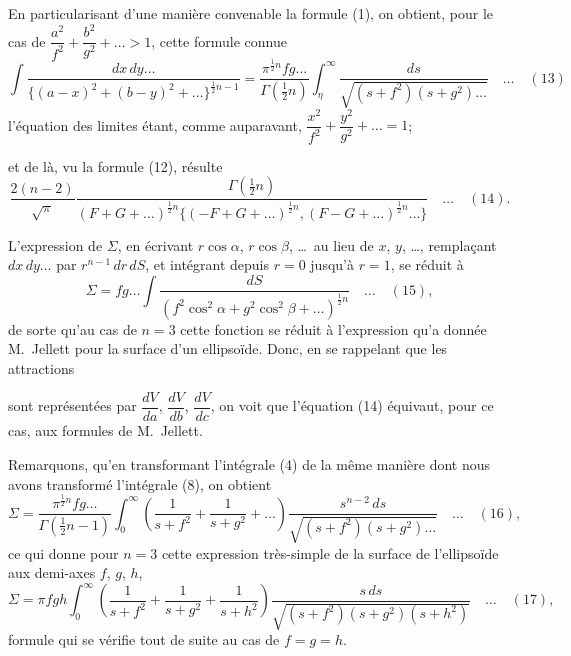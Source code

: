 \documentclass[11pt]{article}
\begin{document}
\medskip
En particularisant d'une mani\`ere convenable la formule (1), on obtient, pour le cas
de $\dfrac{a^{2}}{f^{2}} + \dfrac{b^{2}}{g^{2}} + \ldots > 1$, cette formule connue
\[
\int\frac{dx\,dy\ldots}{\{(a - x)^{2} + (b - y)^{2} + \ldots\}^{\tfrac{1}{2}n - 1}} = \frac{\pi^{\tfrac{1}{2}n}fg\ldots}{\Gamma(\tfrac{1}{2}n)}\int_{\eta}^{\infty}\frac{ds}{\sqrt{(s + f^{2})(s + g^{2})\ldots}}\quad\ldots\quad (13)
\]
l'\'equation des limites \'etant, comme auparavant, $\dfrac{x^{2}}{f^{2}} + \dfrac{y^{2}}{g^{2}} + \ldots = 1$;

\medskip
et de l\`a, vu la formule (12), r\'esulte
\[
\frac{2(n - 2)}{\sqrt{\pi}}\frac{\Gamma(\tfrac{1}{2}n)}{(F + G + \ldots)^{\tfrac{1}{2}n}\{(-F + G + \ldots)^{\tfrac{1}{2}n}, (F - G + \ldots)^{\tfrac{1}{2}n} \ldots\}}\quad\ldots\quad (14).
\]

\medskip
L'expression de $\Sigma$, en \'ecrivant $r\cos\alpha$, $r\cos\beta$, \ldots\ au lieu de $x$, $y$, \ldots, rempla\c{c}ant
$dx\,dy\ldots$ par $r^{n - 1}\,dr\,dS$, et int\'egrant depuis $r = 0$ jusqu'\`a $r = 1$, se r\'eduit \`a
\[
\Sigma = fg\ldots\int\frac{dS}{(f^{2}\cos^{2}\alpha + g^{2}\cos^{2}\beta + \ldots)^{\tfrac{1}{2}n}}\quad\ldots\quad (15),
\]
de sorte qu'au cas de $n = 3$ cette fonction se r\'eduit \`a l'expression qu'a donn\'ee
M.~Jellett pour la surface d'un ellipso\"ide. Donc, en se rappelant que les attractions


sont repr\'esent\'ees par $\dfrac{dV}{da}$, $\dfrac{dV}{db}$, $\dfrac{dV}{dc}$, on voit que l'\'equation (14) \'equivaut, pour ce cas,
aux formules de M.~Jellett.

\medskip
Remarquons, qu'en transformant l'int\'egrale (4) de la m\^eme mani\`ere dont nous avons
transform\'e l'int\'egrale (8), on obtient
\[
\Sigma = \frac{\pi^{\tfrac{1}{2}n}fg\ldots}{\Gamma(\tfrac{1}{2}n - 1)}\int_{0}^{\infty}\!\left(\frac{1}{s + f^{2}} + \frac{1}{s + g^{2}} + \ldots\right)\frac{s^{n - 2}\,ds}{\sqrt{(s + f^{2})(s + g^{2})\ldots}}\quad\ldots\quad (16),
\]
ce qui donne pour $n = 3$ cette expression tr\`es-simple de la surface de l'ellipso\"ide aux
demi-axes $f$, $g$, $h$,
\[
\Sigma = \pi fgh\int_{0}^{\infty}\!\left(\frac{1}{s + f^{2}} + \frac{1}{s + g^{2}} + \frac{1}{s + h^{2}}\right)\frac{s\,ds}{\sqrt{(s + f^{2})(s + g^{2})(s + h^{2})}}\quad\ldots\quad (17),
\]
formule qui se v\'erifie tout de suite au cas de $f = g = h$.
\end{document}
